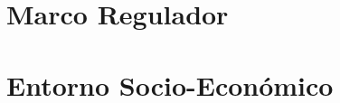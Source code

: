 \documentclass[12pt]{report} %
\begin{document}
\chapter{Marco Regulador}

\chapter{Entorno Socio-Económico}
	
    
    
    
    
    
    
    
    
	

    
    
    
\end{document}
